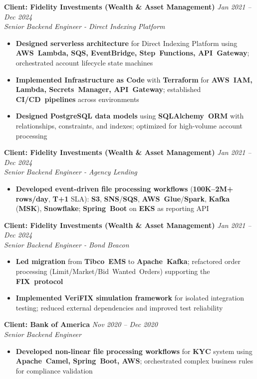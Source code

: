 \documentclass[11pt,a4paper]{article}
\newcommand{\resumeItem}[1]{\item\small{#1}}
\newcommand{\resumeItemList}[1]{\begin{itemize}[leftmargin=0.5in, itemsep=0.25em, parsep=0pt, partopsep=0pt, topsep=0.25em]
    \small
    #1
\end{itemize}}
\begin{document}
\textbf{Client: Fidelity Investments (Wealth \& Asset Management)} \hfill \textit{Jan 2021 -- Dec 2024}\\
\textit{Senior Backend Engineer - Direct Indexing Platform}
\resumeItemList{
    \resumeItem{\textbf{Designed serverless architecture} for Direct Indexing Platform using \textbf{AWS~Lambda, SQS, EventBridge, Step~Functions, API~Gateway}; orchestrated account lifecycle state machines}
    \resumeItem{\textbf{Implemented Infrastructure as Code} with \textbf{Terraform} for \textbf{AWS~IAM, Lambda, Secrets~Manager, API~Gateway}; established \textbf{CI/CD~pipelines} across environments}
    \resumeItem{\textbf{Designed PostgreSQL data models} using \textbf{SQLAlchemy~ORM} with relationships, constraints, and indexes; optimized for high-volume account processing}
}
\vspace{0.4em}

\textbf{Client: Fidelity Investments (Wealth \& Asset Management)} \hfill \textit{Jan 2021 -- Dec 2024}\\
\textit{Senior Backend Engineer - Agency Lending}
\resumeItemList{
    \resumeItem{\textbf{Developed event-driven file processing workflows} (\textbf{100K--2M+ rows/day}, \textbf{T+1} SLA): \textbf{S3}, \textbf{SNS}/\textbf{SQS}, \textbf{AWS~Glue}/\textbf{Spark}, \textbf{Kafka} (\textbf{MSK}), \textbf{Snowflake}; \textbf{Spring~Boot} on \textbf{EKS} as reporting API}
}
\vspace{0.4em}

\textbf{Client: Fidelity Investments (Wealth \& Asset Management)} \hfill \textit{Jan 2021 -- Dec 2024}\\
\textit{Senior Backend Engineer - Bond Beacon}
\resumeItemList{
    \resumeItem{\textbf{Led migration} from \textbf{Tibco~EMS} to \textbf{Apache~Kafka}; refactored order processing (Limit/Market/Bid~Wanted~Orders) supporting the \textbf{FIX~protocol}}
    \resumeItem{\textbf{Implemented \textbf{VeriFIX} simulation framework} for isolated integration testing; reduced external dependencies and improved test reliability}
}
\vspace{0.4em}

\textbf{Client: Bank of America} \hfill \textit{Nov 2020 -- Dec 2020}\\
\textit{Senior Backend Engineer}
\resumeItemList{
    \resumeItem{\textbf{Developed non-linear file processing workflows} for \textbf{KYC} system using \textbf{Apache~Camel, Spring~Boot, AWS}; orchestrated complex business rules for compliance validation}
}
\end{document}
